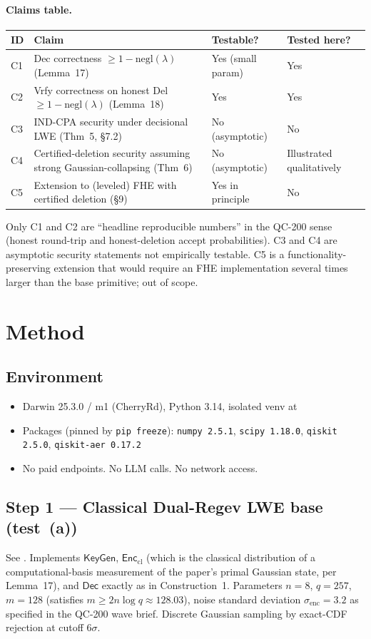 \documentclass[11pt]{article}
\begin{document}
\paragraph{Claims table.}
\begin{center}
\begin{tabular}{@{}llll@{}}
\toprule
ID & Claim & Testable? & Tested here? \\
\midrule
C1 & Dec correctness $\ge 1-\mathrm{negl}(\lambda)$ (Lemma~17) & Yes (small param) & Yes \\
C2 & Vrfy correctness on honest Del $\ge 1-\mathrm{negl}(\lambda)$ (Lemma~18) & Yes & Yes \\
C3 & IND-CPA security under decisional LWE (Thm~5, \S7.2) & No (asymptotic) & No \\
C4 & Certified-deletion security assuming strong Gaussian-collapsing (Thm~6) & No (asymptotic) & Illustrated qualitatively \\
C5 & Extension to (leveled) FHE with certified deletion (\S9) & Yes in principle & No \\
\bottomrule
\end{tabular}
\end{center}
Only C1 and C2 are ``headline reproducible numbers'' in the QC-200 sense
(honest round-trip and honest-deletion accept probabilities). C3 and C4 are
asymptotic security statements not empirically testable. C5 is a
functionality-preserving extension that would require an FHE implementation
several times larger than the base primitive; out of scope.

\section{Method}
\subsection{Environment}
\begin{itemize}
  \item Darwin 25.3.0 / m1 (CherryRd), Python 3.14, isolated venv at 
  \item Packages (pinned by \verb|pip freeze|): \texttt{numpy 2.5.1}, \texttt{scipy 1.18.0}, \texttt{qiskit 2.5.0}, \texttt{qiskit-aer 0.17.2}
  \item No paid endpoints. No LLM calls. No network access.
\end{itemize}

\subsection{Step 1 — Classical Dual-Regev LWE base (test~(a))}
See . Implements
$\mathsf{KeyGen}$, $\mathsf{Enc}_{\mathrm{cl}}$ (which is the classical
distribution of a computational-basis measurement of the paper's primal
Gaussian state, per Lemma~17), and $\mathsf{Dec}$ exactly as in
Construction~1. Parameters $n{=}8$, $q{=}257$, $m{=}128$
(satisfies $m \ge 2n\log q \approx 128.03$), noise standard deviation
$\sigma_{\mathrm{enc}} = 3.2$ as specified in the QC-200 wave brief.
Discrete Gaussian sampling by exact-CDF rejection at cutoff $6\sigma$.
\end{document}
